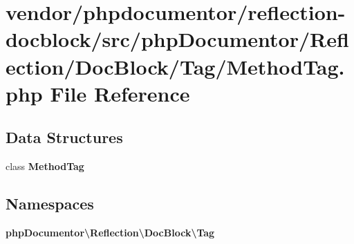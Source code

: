 \section{vendor/phpdocumentor/reflection-\/docblock/src/php\+Documentor/\+Reflection/\+Doc\+Block/\+Tag/\+Method\+Tag.php File Reference}
\label{_method_tag_8php}
\subsection*{Data Structures}
\begin{DoxyCompactItemize}
\item 
class {\bf Method\+Tag}
\end{DoxyCompactItemize}
\subsection*{Namespaces}
\begin{DoxyCompactItemize}
\item 
 {\bf php\+Documentor\textbackslash{}\+Reflection\textbackslash{}\+Doc\+Block\textbackslash{}\+Tag}
\end{DoxyCompactItemize}
